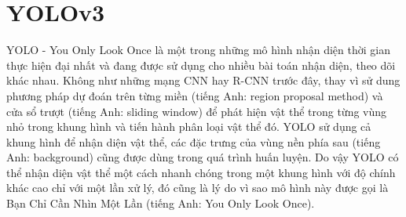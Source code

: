 \section{YOLOv3}
YOLO - You Only Look Once là một trong những mô hình nhận diện thời gian thực hiện đại nhất và đang được sử dụng cho nhiều bài toán nhận diện, theo dõi khác nhau. Không như những mạng CNN hay R-CNN  trước đây, thay vì sử dung phương pháp dự đoán trên từng miền (tiếng Anh: region proposal method) và cửa sổ trượt (tiếng Anh: sliding window) để phát hiện vật thể trong từng vùng nhỏ trong khung hình và tiến hành phân loại vật thể đó. YOLO sử dụng cả khung hình để nhận diện vật thể, các đặc trưng của vùng nền phía sau (tiếng Anh: background) cũng được dùng trong quá trình huấn luyện. Do vậy YOLO có thể nhận diện vật thể một cách nhanh chóng trong một khung hình với độ chính khác cao chỉ với một lần xử lý, đó cũng là lý do vì sao mô hình này được gọi là Bạn Chỉ Cần Nhìn Một Lần (tiếng Anh: You Only Look Once).

